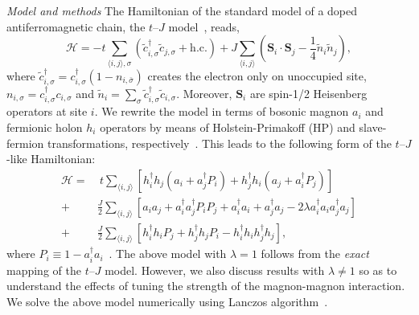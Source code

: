 \documentclass[%
 reprint,
 amsmath,amssymb,
 aps,
prl,
]{revtex4-1}
\newcommand{\mean}[1]{\langle#1\rangle}
\begin{document}
{\it Model and methods}
The Hamiltonian of the standard model of a doped antiferromagnetic chain, the $t$--$J$ model~\cite{Chao1978}, reads,
\begin{equation} \label{eq:H}
    \mathcal{H} = -t\!\!\sum_{\mean{i,j},\sigma}\!\! \left( \tilde{c}_{i,\sigma}^\dag \tilde{c}_{j,\sigma}\! +\! \text{h.c.}\right) + J\!\sum_{\mean{i,j}}\!\!\left(\mathbf S_i \! \cdot\! \mathbf S_j\! -\! \frac{1}{4}\tilde{n}_i\tilde{n}_j \!\right)\!,
\end{equation}
where $\tilde{c}_{i,\sigma}^\dag = c_{i,\sigma}^\dag (1 - n_{i,\bar{\sigma}})$ creates the electron only on unoccupied site, $n_{i,\sigma} = c_{i,\sigma}^\dag c_{i,\sigma}$ and $\tilde{n}_i = \sum_{\sigma}\tilde{c}_{i,\sigma}^\dag\tilde{c}_{i,\sigma}$. Moreover, $\mathbf S_i$ are spin-1/2 Heisenberg operators at site $i$. We rewrite the model in terms of bosonic magnon $a_i$ and fermionic holon $h_i$ operators by means of Holstein-Primakoff (HP) and slave-fermion transformations, respectively~\cite{Mar91}. 
This leads to the following form of the $t$--$J$-like Hamiltonian:
\begin{align}
\label{eq:model}
\mathcal{H} =&~t \sum_{\mean{i,j}} \left[ h_i^\dag h_j
\left( a_i + a_j^\dag P_i \right) + h_j^\dag h_i \left( a_j + a_i^\dag
P_j \right) \right] \nonumber \\ 
+& \frac{J}{2} \sum_{\mean{i,j}} \left[ a_i
a_j + a_i^\dag a_j^\dag P_i P_j
+ a_i^\dag a_i + a_j^\dag a_j -2 \lambda a_i^\dag a_i a_j^\dag a_j
\right] \nonumber \\
+& \frac{J}{2} \sum_{\mean{i,j}} \left[
h_i^\dag h_i P_j + h_j^\dag h_j P_i - h_i^\dag h_i h_j^\dag h_j \right],
\end{align}
where $P_i \equiv 1-a_i^\dag a_i$~\cite{Kon21}.
The above model with $\lambda=1$ follows from the \textit{exact} mapping of the $t$--$J$ model. However, we also discuss results with $\lambda\ne 1$ so as to understand the effects of tuning the strength of the magnon-magnon interaction. We solve the above model numerically using Lanczos algorithm~\cite{KrylovKit}.
\end{document}
